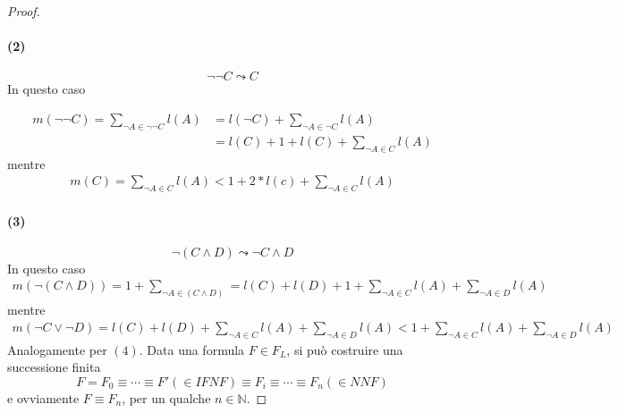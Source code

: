 \begin{proof}
\paragraph{(2)} 
$$
\neg \neg C \leadsto C
$$
In questo caso 

\begin{align*}
        m(\neg \neg C) = \sum_{\neg A \in \neg \neg C} l(A) &= l(\neg C) + \sum_{\neg A \in \neg C} l(A) \\
                                                            & =l(C) + 1 + l(C) + \sum_{\neg A \in C} l(A)
\end{align*}
mentre 
\begin{align*}
        m(C) = \sum_{\neg A \in C} l(A) < 1 + 2*l(c) + \sum_{\neg A \in C} l(A)
\end{align*}

\paragraph{(3)}
$$
\neg (C \land D) \leadsto \neg C \land D
$$
In questo caso 
\begin{align*}
        m(\neg (C \land D)) = 1 + \sum_{\neg A \in (C \land D)} = l(C) + l(D) + 1 + \sum_{\neg A \in C} l(A) + \sum_{\neg A \in D} l(A)
\end{align*}
mentre 
\begin{align*}
        m(\neg C\lor \neg D) = l(C) + l(D) + \sum_{\neg A \in C} l(A) + \sum_{\neg A \in D} l(A) < 1 + \sum_{\neg A \in C} l(A) + \sum_{\neg A \in D} l(A) 
\end{align*}
Analogamente per $(4)$. Data una formula $F \in F_L$, si può costruire una successione 
finita 
$$ 
F = F_0 \equiv \cdots \equiv F' (\in IFNF) \equiv F_i \equiv \cdots \equiv F_n (\in NNF)
$$
e ovviamente $F \equiv F_n$, per un qualche $n \in \mathbb{N}$. 
\end{proof}

